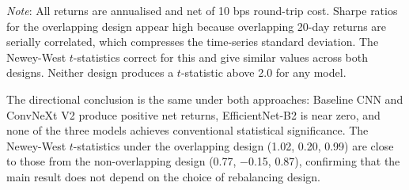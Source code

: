 \begin{table}[H]
\centering
\caption{Portfolio Performance: Non-Overlapping vs.\ Overlapping Rebalancing (Test Period 2021--2026)}
\label{tab:portfolio_ext}
\smallskip\par
{\small \textit{Note}: All returns are annualised and net of 10 bps round-trip cost. Sharpe ratios for the overlapping design appear high because overlapping 20-day returns are serially correlated, which compresses the time-series standard deviation. The Newey-West $t$-statistics correct for this and give similar values across both designs. Neither design produces a $t$-statistic above 2.0 for any model.}
\end{table}

The directional conclusion is the same under both approaches: Baseline CNN and ConvNeXt V2 produce positive net returns, EfficientNet-B2 is near zero, and none of the three models achieves conventional statistical significance. The Newey-West $t$-statistics under the overlapping design (1.02, 0.20, 0.99) are close to those from the non-overlapping design (0.77, $-$0.15, 0.87), confirming that the main result does not depend on the choice of rebalancing design.
